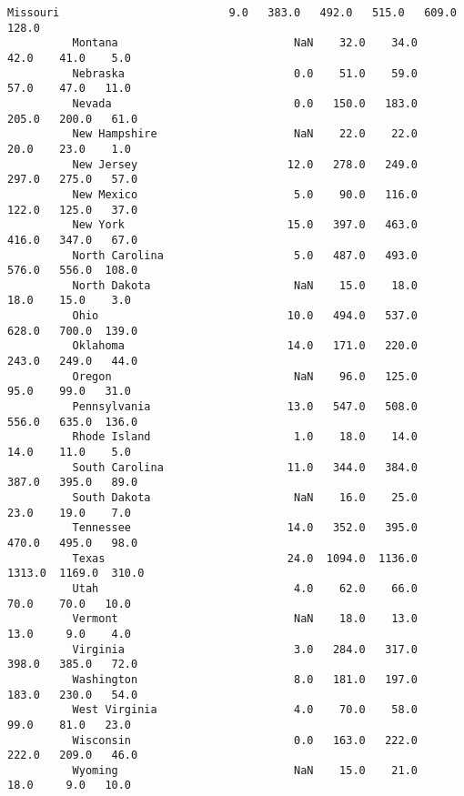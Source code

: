 \documentclass[11pt]{article}
\begin{document}
\begin{Verbatim}[commandchars=\\\{\}]
          Missouri                          9.0   383.0   492.0   515.0   609.0  128.0   
          Montana                           NaN    32.0    34.0    42.0    41.0    5.0   
          Nebraska                          0.0    51.0    59.0    57.0    47.0   11.0   
          Nevada                            0.0   150.0   183.0   205.0   200.0   61.0   
          New Hampshire                     NaN    22.0    22.0    20.0    23.0    1.0   
          New Jersey                       12.0   278.0   249.0   297.0   275.0   57.0   
          New Mexico                        5.0    90.0   116.0   122.0   125.0   37.0   
          New York                         15.0   397.0   463.0   416.0   347.0   67.0   
          North Carolina                    5.0   487.0   493.0   576.0   556.0  108.0   
          North Dakota                      NaN    15.0    18.0    18.0    15.0    3.0   
          Ohio                             10.0   494.0   537.0   628.0   700.0  139.0   
          Oklahoma                         14.0   171.0   220.0   243.0   249.0   44.0   
          Oregon                            NaN    96.0   125.0    95.0    99.0   31.0   
          Pennsylvania                     13.0   547.0   508.0   556.0   635.0  136.0   
          Rhode Island                      1.0    18.0    14.0    14.0    11.0    5.0   
          South Carolina                   11.0   344.0   384.0   387.0   395.0   89.0   
          South Dakota                      NaN    16.0    25.0    23.0    19.0    7.0   
          Tennessee                        14.0   352.0   395.0   470.0   495.0   98.0   
          Texas                            24.0  1094.0  1136.0  1313.0  1169.0  310.0   
          Utah                              4.0    62.0    66.0    70.0    70.0   10.0   
          Vermont                           NaN    18.0    13.0    13.0     9.0    4.0   
          Virginia                          3.0   284.0   317.0   398.0   385.0   72.0   
          Washington                        8.0   181.0   197.0   183.0   230.0   54.0   
          West Virginia                     4.0    70.0    58.0    99.0    81.0   23.0   
          Wisconsin                         0.0   163.0   222.0   222.0   209.0   46.0   
          Wyoming                           NaN    15.0    21.0    18.0     9.0   10.0   
          

\end{Verbatim}
\end{document}
